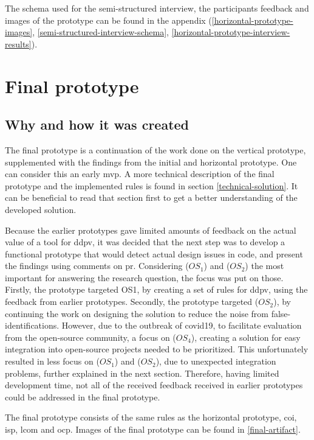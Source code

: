 \documentclass[pdftex,10pt,b5paper,twoside]{report}
\begin{document}
The schema used for the semi-structured interview, the participants feedback and images of the prototype can be found in the appendix (\ref{horizontal-prototype-images}, \ref{semi-structured-interview-schema}, \ref{horizontal-prototype-interview-results}).

\section{Final prototype}
\label{final-prototype}

\subsection*{Why and how it was created}
The final prototype is a continuation of the work done on the vertical prototype, supplemented with the findings from the initial and horizontal prototype. One can consider this an early \gls{mvp}. A more technical description of the final prototype and the implemented rules is found in section \ref{technical-solution}. It can be beneficial to read that section first to get a better understanding of the developed solution.

Because the earlier prototypes gave limited amounts of feedback on the actual value of a tool for \gls{ddpv}, it was decided that the next step was to develop a functional prototype that would detect actual design issues in code, and present the findings using comments on \gls{pr}. Considering (\(OS_{1}\)) and (\(OS_{2}\)) the most important for answering the research question, the focus was put on those. Firstly, the prototype targeted OS1, by creating a set of rules for \gls{ddpv}, using the feedback from earlier prototypes. Secondly, the prototype targeted (\(OS_{2}\)), by continuing the work on designing the solution to reduce the noise from false-identifications. However, due to the outbreak of \gls{covid19}, to facilitate evaluation from the open-source community, a focus on (\(OS_{4}\)), creating a solution for easy integration into open-source projects needed to be prioritized. This unfortunately resulted in less focus on (\(OS_{1}\)) and (\(OS_{2}\)), due to unexpected integration problems, further explained in the next section. Therefore, having limited development time, not all of the received feedback received in earlier prototypes could be addressed in the final prototype. 

The final prototype consists of the same rules as the horizontal prototype, \gls{coi}, \gls{isp}, \gls{lcom} and \gls{ocp}. Images of the final prototype can be found in \ref{final-artifact}.
\end{document}
